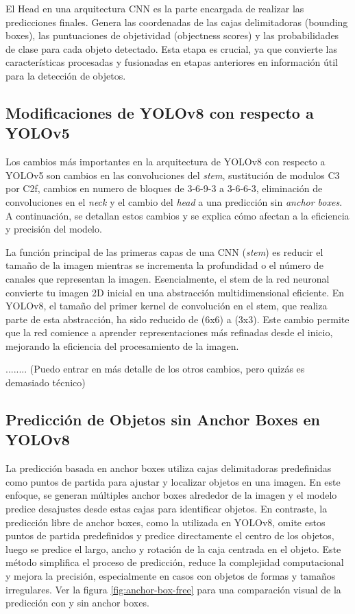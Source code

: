 El Head en una arquitectura CNN es la parte encargada de realizar las predicciones finales. Genera las coordenadas de las cajas delimitadoras (bounding boxes), las puntuaciones de objetividad (objectness scores) y las probabilidades de clase para cada objeto detectado. Esta etapa es crucial, ya que convierte las características procesadas y fusionadas en etapas anteriores en información útil para la detección de objetos.

\subsection{Modificaciones de YOLOv8 con respecto a YOLOv5}
Los cambios más importantes en la arquitectura de YOLOv8 con respecto a YOLOv5 son cambios en las convoluciones del \textit{stem}, sustitución de modulos C3 por C2f, cambios en numero de bloques de 3-6-9-3 a 3-6-6-3, eliminación de convoluciones en el \textit{neck} y el cambio del \textit{head} a una predicción sin \textit{anchor boxes}. A continuación, se detallan estos cambios y se explica cómo afectan a la eficiencia y precisión del modelo.

La función principal de las primeras capas de una CNN (\textit{stem}) es reducir el tamaño de la imagen mientras se incrementa la profundidad o el número de canales que representan la imagen. Esencialmente, el stem de la red neuronal convierte tu imagen 2D inicial en una abstracción multidimensional eficiente. En YOLOv8, el tamaño del primer kernel de convolución en el stem, que realiza parte de esta abstracción, ha sido reducido de (6x6) a (3x3). Este cambio permite que la red comience a aprender representaciones más refinadas desde el inicio, mejorando la eficiencia del procesamiento de la imagen.

........ (Puedo entrar en más detalle de los otros cambios, pero quizás es demasiado técnico)


\subsection{Predicción de Objetos sin Anchor Boxes en YOLOv8}
La predicción basada en anchor boxes utiliza cajas delimitadoras predefinidas como puntos de partida para ajustar y localizar objetos en una imagen. En este enfoque, se generan múltiples anchor boxes alrededor de la imagen y el modelo predice desajustes desde estas cajas para identificar objetos. En contraste, la predicción libre de anchor boxes, como la utilizada en YOLOv8, omite estos puntos de partida predefinidos y predice directamente el centro de los objetos, luego se predice el largo, ancho y rotación de la caja centrada en el objeto. Este método simplifica el proceso de predicción, reduce la complejidad computacional y mejora la precisión, especialmente en casos con objetos de formas y tamaños irregulares. Ver la figura \ref{fig:anchor-box-free} para una comparación visual de la predicción con y sin anchor boxes.

